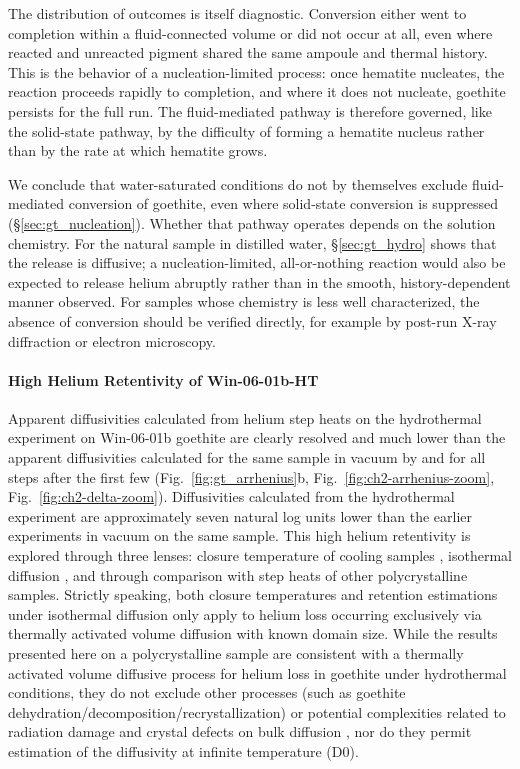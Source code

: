 The distribution of outcomes is itself diagnostic. Conversion either went to completion within
a fluid-connected volume or did not occur at all, even where reacted and unreacted pigment shared
the same ampoule and thermal history. This is the behavior of a nucleation-limited process:
once hematite nucleates, the reaction proceeds rapidly to completion, and where it does not
nucleate, goethite persists for the full run. The fluid-mediated pathway is therefore governed,
like the solid-state pathway, by the difficulty of forming a hematite nucleus rather than by the
rate at which hematite grows.

We conclude that water-saturated conditions do not by themselves exclude fluid-mediated
conversion of goethite, even where solid-state conversion is suppressed (\S\ref{sec:gt_nucleation}). Whether that pathway operates
depends on the solution chemistry. For the natural sample in distilled water,
\S\ref{sec:gt_hydro} shows that the release is diffusive; a nucleation-limited, all-or-nothing
reaction would also be expected to release helium abruptly rather than in the smooth,
history-dependent manner observed. For samples whose chemistry is less well characterized, the
absence of conversion should be verified directly, for example by post-run X-ray diffraction or
electron microscopy.

\paragraph{\texorpdfstring{High Helium Retentivity of
Win-06-01b-HT}{ High Helium Retentivity of Win-06-01b-HT}}\label{high-helium-retentivity-of-win-06-01b-ht}

Apparent diffusivities calculated from helium step heats on the
hydrothermal experiment on Win-06-01b goethite are clearly resolved and
much lower than the apparent diffusivities calculated for the same
sample in vacuum by \citet{monteiro2017} and \citet{farley2024} for all steps
after the first few (Fig.~\ref{fig:gt_arrhenius}b, Fig.~\ref{fig:ch2-arrhenius-zoom}, Fig.~\ref{fig:ch2-delta-zoom}). Diffusivities calculated
from the hydrothermal experiment are approximately seven natural log
units lower than the earlier experiments in vacuum on the same sample. This high
helium retentivity is explored through three lenses: closure temperature
of cooling samples \citep{dodson1973}, isothermal diffusion \citep{wolf1998}, and through comparison with step heats of other polycrystalline
samples. Strictly speaking, both closure temperatures and retention
estimations under isothermal diffusion only apply to helium loss
occurring exclusively via thermally activated volume diffusion with
known domain size. While the results presented here on a polycrystalline
sample are consistent with a thermally activated volume diffusive
process for helium loss in goethite under hydrothermal conditions, they
do not exclude other processes (such as goethite
dehydration/decomposition/recrystallization) or potential complexities
related to radiation damage and crystal defects on bulk diffusion
\citep{bassal2022}, nor do they permit estimation of the diffusivity
at infinite temperature (D0).

